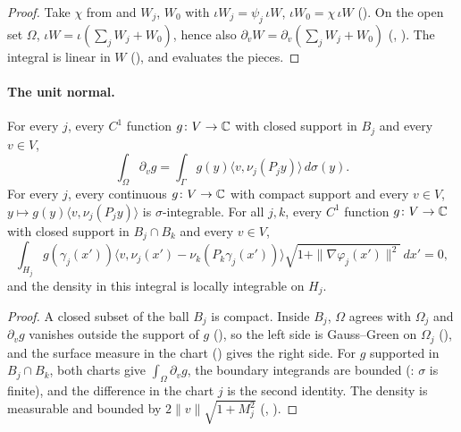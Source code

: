 \begin{proof}
\leanok
Take $\chi$ from  and $W_j$, $W_0$ with
$\iota W_j = \psi_j \, \iota W$, $\iota W_0 = \chi \, \iota W$ ().
On the open set $\Omega$, $\iota W = \iota (\sum_j W_j + W_0)$, hence also
$\partial_v W = \partial_v (\sum_j W_j + W_0)$ (,
). The integral is linear in $W$
(), and  evaluates the pieces.
\end{proof}

\paragraph{The unit normal.}

\begin{lemma}
\label{lem:domain-gauss-green-chart}
\leanok
{}
For every $j$, every $C^1$ function $g \colon V \to \mathbb{C}$ with closed support in $B_j$ and every
$v \in V$,
\[
  \int_\Omega \partial_v g = \int_\Gamma g(y) \langle v, \nu_j(P_j y) \rangle \, d\sigma(y) .
\]
For every $j$, every continuous $g \colon V \to \mathbb{C}$ with compact support and every $v \in V$,
$y \mapsto g(y) \langle v, \nu_j(P_j y) \rangle$ is $\sigma$-integrable. For all $j, k$, every
$C^1$ function $g \colon V \to \mathbb{C}$ with closed support in $B_j \cap B_k$
and every $v \in V$,
\[
  \int_{H_j} g(\gamma_j(x')) \bigl\langle v, \nu_j(x') - \nu_k(P_k \gamma_j(x')) \bigr\rangle
    \sqrt{1 + \|\nabla\varphi_j(x')\|^2} \, dx' = 0 ,
\]
and the density in this integral is locally integrable on $H_j$.
\end{lemma}

\begin{proof}
\leanok
A closed subset of the ball $B_j$ is compact. Inside $B_j$, $\Omega$ agrees with $\Omega_j$ and
$\partial_v g$ vanishes outside the support of $g$ (), so the
left side is Gauss--Green on $\Omega_j$
(), and the surface measure in the chart
() gives the right side. For $g$ supported in
$B_j \cap B_k$, both charts give $\int_\Omega \partial_v g$, the boundary integrands are bounded
(: $\sigma$ is finite), and the difference in the chart $j$ is
the second identity. The density is measurable and bounded by
$2 \|v\| \sqrt{1 + M_j^2}$ (, ).
\end{proof}

